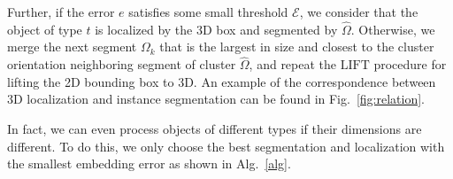 \documentclass[graybox]{svmult}
\begin{document}

Further, if the error $e$ satisfies some small threshold $\mathcal{E}$, we consider that the object of type $t$ is localized by the  3D box and segmented by $\hat{\Omega}$. Otherwise, we merge the next segment $\Omega_k$ that is  the largest in size and closest to the cluster orientation neighboring segment of cluster $\hat{\Omega}$, and repeat the $\mathrm{LIFT}$ procedure for lifting the 2D bounding box to 3D. An example of the correspondence between 3D localization and instance segmentation can be found in Fig.~\ref{fig:relation}.

In fact, we can even process objects of different types if their dimensions are different. To do this, we only choose the best segmentation and localization with the smallest embedding error as shown in Alg.~\ref{alg}.
\end{document}
